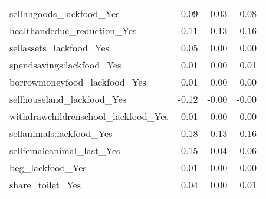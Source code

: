 \begin{longtable}{lrrr}
sellhhgoods\_lackfood\_Yes &                0.09 &                0.03 &                      0.08 \\
healthandeduc\_reduction\_Yes &                0.11 &                0.13 &                      0.16 \\
sellassets\_lackfood\_Yes &                0.05 &                0.00 &                      0.00 \\
spendsavings:lackfood\_Yes &                0.01 &                0.00 &                      0.01 \\
borrowmoneyfood\_lackfood\_Yes &                0.01 &                0.00 &                      0.00 \\
sellhouseland\_lackfood\_Yes &               -0.12 &               -0.00 &                     -0.00 \\
withdrawchildrenschool\_lackfood\_Yes &                0.01 &                0.00 &                      0.00 \\
sellanimals:lackfood\_Yes &               -0.18 &               -0.13 &                     -0.16 \\
sellfemaleanimal\_last\_Yes &               -0.15 &               -0.04 &                     -0.06 \\
beg\_lackfood\_Yes &                0.01 &               -0.00 &                      0.00 \\
share\_toilet\_Yes &                0.04 &                0.00 &                      0.01 \\
\end{longtable}